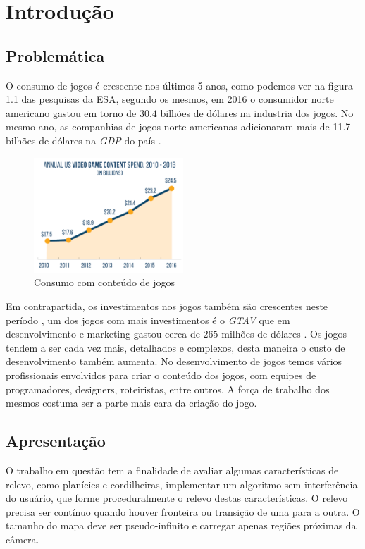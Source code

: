 
\chapter{Introdução}

\section{Problemática}
O consumo de jogos é crescente nos últimos 5 anos, como podemos ver na figura
\ref{fig:esa_graph_2017} das pesquisas da ESA,
segundo os mesmos, em 2016 o consumidor norte americano gastou em torno de $30.4$
bilhões de dólares na industria dos jogos. No mesmo ano, as companhias de jogos
norte americanas adicionaram mais de 11.7 bilhões de dólares na \textit{GDP}
do país \cite{entertainment2017essential}.
\begin{figure}[H]
    \centering
    \includegraphics[width=0.5\textwidth]{figuras/ESAGraph2017.png}
    \caption{Consumo com conteúdo de jogos\cite{entertainment2017essential}}
    \label{fig:esa_graph_2017}
\end{figure}

Em contrapartida, os investimentos nos jogos também são crescentes neste
período \cite{entertainment2017essential}, um dos jogos com mais investimentos é
o \textit{GTAV} que em desenvolvimento e marketing gastou cerca de $265$
milhões de dólares \cite{villapaz2013gta}. Os jogos tendem a ser cada vez mais,
detalhados e complexos, desta maneira o custo de desenvolvimento também aumenta.
No desenvolvimento de jogos temos vários profissionais envolvidos para criar
o conteúdo dos jogos, com equipes de programadores, designers,  roteiristas,
entre outros. A força de trabalho dos mesmos costuma ser a parte mais cara da
criação do jogo.

\section{Apresentação}
O trabalho em questão tem a finalidade de avaliar algumas características
de relevo, como planícies e cordilheiras, implementar um algoritmo sem 
interferência do usuário, que forme proceduralmente o relevo destas características.
O relevo precisa ser contínuo quando houver fronteira ou transição de uma para 
a outra. O tamanho do mapa deve ser pseudo-infinito e carregar apenas regiões
próximas da câmera.

